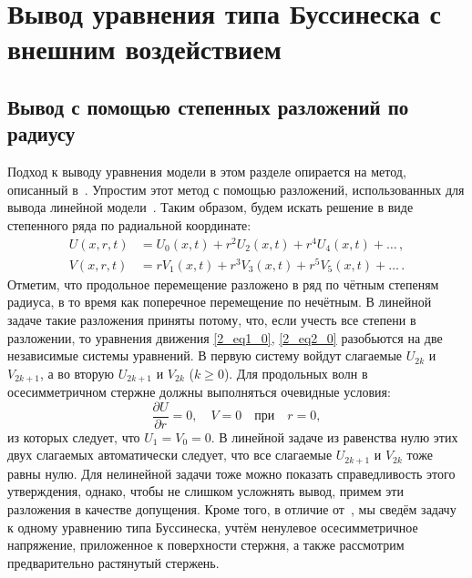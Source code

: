 \documentclass[12pt, a4paper]{report}
\newcommand{\pdiff}[2]{\frac{\partial #1}{\partial #2}}
\begin{document}
\section{Вывод уравнения типа Буссинеска с внешним воздействием} 
\subsection{Вывод с помощью степенных разложений по радиусу}
\label{sec:derivation}
Подход к выводу уравнения модели в этом разделе опирается на метод, описанный в~\cite{DF}. Упростим этот метод с помощью разложений, использованных для вывода линейной модели~\cite{bostrm2000}. Таким образом, будем искать решение в виде степенного ряда по радиальной координате:
\begin{align}
\label{u_series}
U(x,r,t) &= U_0(x,t) + r^2 U_2(x,t) + r^4 U_4(x,t) + \dots \, ,\\
\label{v_series}
V(x,r,t) &= r V_1(x,t) + r^3 V_3(x,t) + r^5 V_5(x,t) + \dots \, .
\end{align}
Отметим, что продольное перемещение разложено в ряд по чётным степеням радиуса, в то время как поперечное перемещение по нечётным. В линейной задаче такие разложения приняты потому, что, если учесть все степени в разложении, то уравнения движения \eqref{2_eq1_0}, \eqref{2_eq2_0} разобьются на две независимые системы уравнений. В первую систему войдут слагаемые $U_{2k}$ и $V_{2k+1}$, а во вторую $U_{2k+1}$ и $V_{2k}$ ($k \geqslant 0$). Для продольных волн в осесимметричном стержне должны выполняться очевидные условия:
\begin{equation}\label{2_longitud_cond}
\pdiff{U}{r} = 0, \quad V = 0 \quad \text{при} \quad r = 0,
\end{equation}
из которых следует, что $U_1 = V_0 = 0$. В линейной задаче из равенства нулю этих двух слагаемых автоматически следует, что все слагаемые $U_{2k+1}$ и $V_{2k}$ тоже равны нулю. Для нелинейной задачи тоже можно показать справедливость этого утверждения, однако, чтобы не слишком усложнять вывод, примем эти разложения в качестве допущения. Кроме того, в отличие от~\cite{DF}, мы сведём задачу к одному уравнению типа Буссинеска, учтём ненулевое осесимметричное напряжение, приложенное к поверхности стержня, а также рассмотрим предварительно растянутый стержень.
\end{document}
